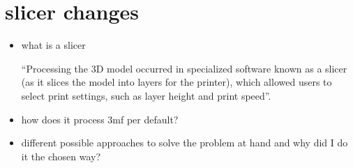 \section{slicer changes}
\begin{itemize}
    \item what is a slicer

    ``Processing the 3D model occurred in specialized software known as a slicer (as it slices the model into layers for the printer), which allowed users to select print settings, such as layer height and print speed''\cite[p.~389]{hudson_understanding_2016}.

    \item how does it process 3mf per default? 
    \item different possible approaches to solve the problem at hand and why did I do it the chosen way? 
\end{itemize}